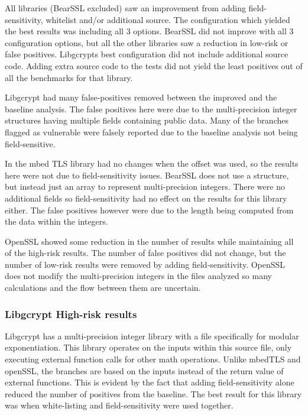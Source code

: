 All libraries (BearSSL excluded) saw an improvement from adding
field-sensitivity, whitelist and/or additional source. The configuration which
yielded the best results was including all 3 options. BearSSL did not improve
with all 3 configuration options, but all the other libraries saw a reduction in
low-risk or false positives. Libgcrypts best configuration did not include
additional source code. Adding extra source code to the tests did not yield the
least positives out of all the benchmarks for that library.


Libgcrypt had many false-positives removed between the improved and the baseline
analysis. The false positives here were due to the multi-precision integer
structures having multiple fields containing public data. Many of the branches
flagged as vulnerable were falsely reported due to the baseline analysis not being field-sensitive.

 In the mbed TLS library had no changes when the offset was used, so the results
 here were not due to field-sensitivity issues. BearSSL does not use a structure,
 but instead just an array to represent multi-precision integers. There were no
 additional fields so field-sensitivity had no effect on the results for this
 library either. The false positives however were due to the length being
 computed from the data within the integers.

 OpenSSL showed some reduction in the number of results while maintaining all of
 the high-risk results. The number of false positives did not change, but the
 number of low-risk results were removed by adding field-sensitivity. OpenSSL
 does not modify the multi-precision integers in the files analyzed so many
 calculations and the flow between them are uncertain.

\subsubsection{Libgcrypt High-risk results}


     Libgcrypt has a multi-precision integer library with a file specifically
     for modular exponentiation. This library operates on the inputs within this
     source file, only executing external function calls for other math
     operations. Unlike mbedTLS and openSSL, the branches are based on the
     inputs instead of the return value of external functions. This is evident
     by the fact that adding field-sensitivity alone reduced the number of
     positives from the baseline. The best result for this library was when
     white-listing and field-sensitivity were used together.

